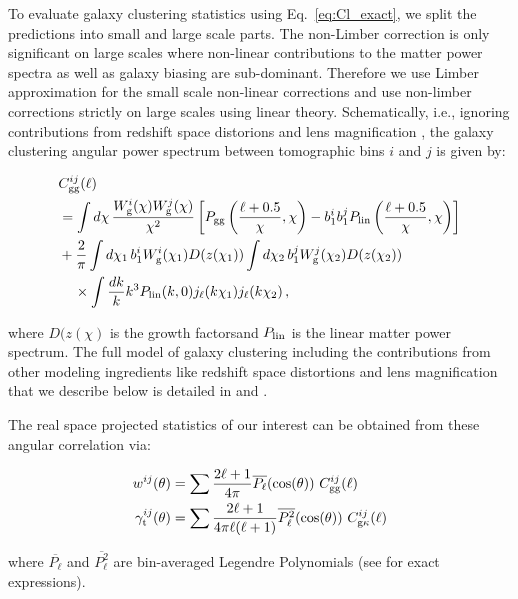 \documentclass[fleqn,usenatbib]{mnras}
\begin{document}
To evaluate galaxy clustering statistics using Eq.~\ref{eq:Cl_exact}, we split the predictions into small and large scale parts. The non-Limber correction is only significant on large scales where non-linear contributions to the matter power spectra as well as galaxy biasing are sub-dominant. Therefore we use Limber approximation for the small scale non-linear corrections and use non-limber corrections strictly on large scales using linear theory. Schematically, i.e., ignoring contributions from redshift space distorions and lens magnification \cite[c.f.][for details]{y3-generalmethods}, the galaxy clustering angular power spectrum between tomographic bins $i$ and $j$ is given by:
\begin{linenomath*}
\begin{align}\label{eq:Clgg_exact}
    &C_{\rm gg}^{ij} (\ell) \nonumber\\
    &= \int d\chi\, \frac{W_{\rm g}^i(\chi)W_{\rm g}^j(\chi)}{\chi^2} \left[P_{\rm gg}\left(\frac{\ell+0.5}{\chi},\chi\right)- b_1^{i} b_1^{j} P_{\rm lin}\left(\frac{\ell+0.5}{\chi},\chi\right)\right]\nonumber\\
    &+\frac{2}{\pi}\int d\chi_1\,b_{1}^i W_{\rm g}^i(\chi_1) D(z(\chi_1))\int d\chi_2\,b_{1}^j W_{\rm g}^j(\chi_2)D(z(\chi_2))\nonumber\\
    &\;\;\;\;\times \int\frac{dk}{k}k^3 P_{\rm lin}(k,0)j_\ell(k\chi_1)j_\ell(k\chi_2)\,,
\label{eq:Cl-DD_rewrite}
\end{align}
\end{linenomath*}
where $D(z(\chi)$ is the growth factorsand $P_{\rm lin}$ is the linear matter power spectrum. The full model of galaxy clustering including the contributions from other modeling ingredients like redshift space distortions and lens magnification that we describe below is detailed in \cite{Fang_nonlimber} and \cite{y3-generalmethods}. 

The real space projected statistics of our interest can be obtained from these angular correlation via:
\begin{linenomath*}
\begin{align}\label{eq:2pt_exact}
    w^{ij}(\theta) &= \sum \frac{2\ell + 1}{4\pi} \overline{P_{\ell}}(\cos(\theta)) \ C^{ij}_{\rm gg}(\ell) \\
    \gamma_{\rm t}^{ij}(\theta) &= \sum \frac{2\ell + 1}{4\pi \ell (\ell + 1)} \overline{P_{\ell}^2}(\cos(\theta)) \ C^{ij}_{\rm g\kappa}(\ell)
\end{align}
\end{linenomath*}
where $\overline{P_{\ell}}$ and $\overline{P_{\ell}^2}$ are bin-averaged Legendre Polynomials (see \cite{y3-covariances} for exact expressions). 
\end{document}

